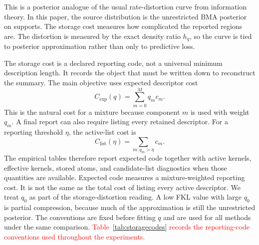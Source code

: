 \documentclass[twoside,11pt]{article}
\newcommand{\rev}[1]{\textcolor{red}{#1}}
\begin{document}
This is a posterior analogue of the usual rate-distortion curve from information theory. In this paper, the source distribution is the unrestricted BMA posterior on supports. The storage cost measures how complicated the reported regions are. The distortion is measured by the exact density ratio \(h_q\), so the curve is tied to posterior approximation rather than only to predictive loss.

The storage cost is a declared reporting code, not a universal minimum description length. It records the object that must be written down to reconstruct the summary. The main objective uses expected descriptor cost
\[
C_{\mathrm{exp}}(q)=\sum_{m=0}^M q_m c_m.
\]
This is the natural cost for a mixture because component \(m\) is used with weight \(q_m\). A final report can also require listing every retained descriptor. For a reporting threshold \(\eta\), the active-list cost is
\[
C_{\mathrm{list}}(\eta)=\sum_{m:q_m>\eta} c_m.
\]
The empirical tables therefore report expected code together with active kernels, effective kernels, stored atoms, and candidate-list diagnostics when those quantities are available. Expected code measures a mixture-weighted reporting cost. It is not the same as the total cost of listing every active descriptor. We treat \(q_0\) as part of the storage-distortion reading. A low FKL value with large \(q_0\) is partial compression, because much of the approximation is still the unrestricted posterior. The conventions are fixed before fitting \(q\) and are used for all methods under the same comparison. \rev{Table~\ref{tab:storagecodes} records the reporting-code conventions used throughout the experiments.}

\begin{table}[!htbp]
\centering
\scriptsize

\caption{Reporting-code conventions used by the storage-distortion objective.}
\label{tab:storagecodes}
\end{table}
\end{document}
